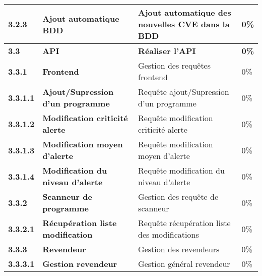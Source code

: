 \begin{supertabular}{|p{2.8cm} p{6cm}|p{5cm}|R{2cm}|}
  \hspace{6pt}
  \textbf{3.2.3}  & \textbf{Ajout automatique BDD} & Ajout automatique des nouvelles CVE dans la BDD & 0\% \\
  \hline



  \textbf{3.3}  & \textbf{API} & \textbf{Réaliser l'API} & \textbf{0\%} \\
  \hline

  \hspace{6pt}
  \textbf{3.3.1}  & \textbf{Frontend} & Gestion des requêtes frontend & 0\% \\
  \hline

  \hspace{12pt}
  \textbf{3.3.1.1}  & \textbf{Ajout/Supression d'un programme} & Requête ajout/Supression d'un programme  & 0\% \\
  \hline

  \hspace{12pt}
  \textbf{3.3.1.2}  & \textbf{Modification criticité alerte} & Requête modification criticité alerte & 0\% \\
  \hline

  \hspace{12pt}
  \textbf{3.3.1.3}  & \textbf{Modification moyen d'alerte} & Requête modification moyen d'alerte  & 0\% \\
  \hline

  \hspace{12pt}
  \textbf{3.3.1.4}  & \textbf{Modification du niveau d'alerte} & Requête modification du niveau d'alerte  & 0\% \\
  \hline


  \hspace{6pt}
  \textbf{3.3.2}  & \textbf{Scanneur de programme} & Gestion des requête de scanneur & 0\% \\
  \hline

  \hspace{12pt}
  \textbf{3.3.2.1}  & \textbf{Récupération liste modification} & Requête récupération liste des modifications  & 0\% \\
  \hline


  \hspace{6pt}
  \textbf{3.3.3}  & \textbf{Revendeur} & Gestion des revendeurs & 0\% \\
  \hline

  \hspace{12pt}
  \textbf{3.3.3.1}  & \textbf{Gestion revendeur} & Gestion général revendeur  & 0\% \\
  \hline


\end{supertabular}
